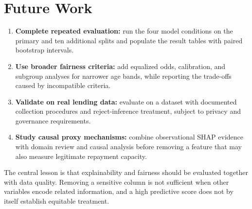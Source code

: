 \section{Future Work}

\begin{enumerate}
  \item \textbf{Complete repeated evaluation:} run the four model conditions
  on the primary and ten additional splits and populate the result tables with
  paired bootstrap intervals.
  \item \textbf{Use broader fairness criteria:} add equalized odds,
  calibration, and subgroup analyses for narrower age bands, while reporting
  the trade-offs caused by incompatible criteria.
  \item \textbf{Validate on real lending data:} evaluate on a dataset with
  documented collection procedures and reject-inference treatment, subject to
  privacy and governance requirements.
  \item \textbf{Study causal proxy mechanisms:} combine observational SHAP
  evidence with domain review and causal analysis before removing a feature
  that may also measure legitimate repayment capacity.
\end{enumerate}

The central lesson is that explainability and fairness should be evaluated
together with data quality. Removing a sensitive column is not sufficient when
other variables encode related information, and a high predictive score does
not by itself establish equitable treatment.
